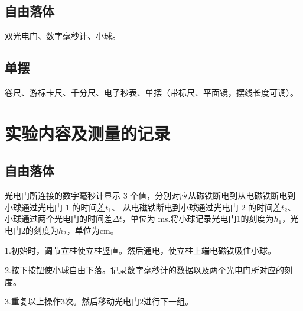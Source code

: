 \documentclass[11pt]{article}
\begin{document}
\subsection{自由落体}
双光电门、数字毫秒计、小球。
\subsection{单摆}
卷尺、游标卡尺、千分尺、电子秒表、单摆（带标尺、平面镜，摆线长度可调）。
\section{实验内容及测量的记录}
\subsection{自由落体}
光电门所连接的数字毫秒计显示 3 个值，分别对应从磁铁断电到从电磁铁断电到小球通过光电门 1 的时间差$ t_1 $、 从电磁铁断电到小球通过光电门 2 的时间差$ t_2 $、小球通过两个光电门的时间差$ \Delta t $，单位为 ms.将小球记录光电门1的刻度为$ h_1 $，光电门2的刻度为$ h_2 $，单位为cm。

1.初始时，调节立柱使立柱竖直。然后通电，使立柱上端电磁铁吸住小球。

2.按下按钮使小球自由下落。记录数字毫秒计的数据以及两个光电门所对应的刻度。

3.重复以上操作3次。然后移动光电门2进行下一组。
\end{document}
